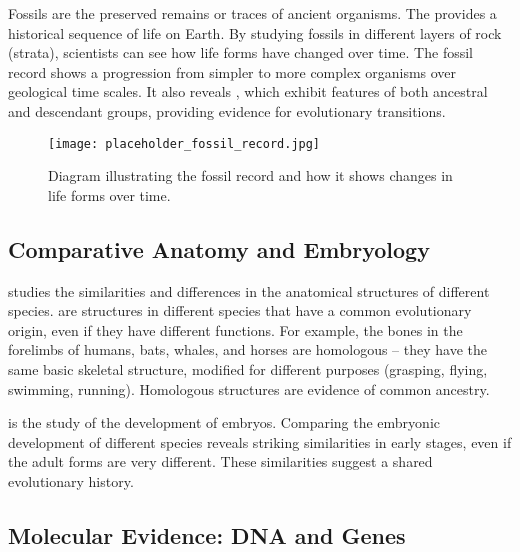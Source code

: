 Fossils are the preserved remains or traces of ancient organisms. The  provides a historical sequence of life on Earth. By studying fossils in different layers of rock (strata), scientists can see how life forms have changed over time.  The fossil record shows a progression from simpler to more complex organisms over geological time scales.  It also reveals , which exhibit features of both ancestral and descendant groups, providing evidence for evolutionary transitions.

\begin{marginnote}
\end{marginnote}

\begin{figure}[htbp]
\centering
\texttt{[image: placeholder\_fossil\_record.jpg]}
\caption{Diagram illustrating the fossil record and how it shows changes in life forms over time.}
\end{figure}

\subsection{Comparative Anatomy and Embryology}

 studies the similarities and differences in the anatomical structures of different species.   are structures in different species that have a common evolutionary origin, even if they have different functions. For example, the bones in the forelimbs of humans, bats, whales, and horses are homologous – they have the same basic skeletal structure, modified for different purposes (grasping, flying, swimming, running). Homologous structures are evidence of common ancestry.

 is the study of the development of embryos.  Comparing the embryonic development of different species reveals striking similarities in early stages, even if the adult forms are very different.  These similarities suggest a shared evolutionary history.

\subsection{Molecular Evidence: DNA and Genes}

